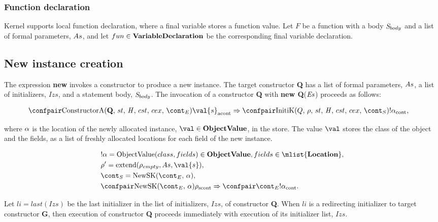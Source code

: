 \documentclass{article}
\DeclareMathOperator{\extend}{extend}
\newcommand{\cesktrans}[2]{\ensuremath{{#1} \Rightarrow {#2}}}
\begin{document}
\subsubsection{Function declaration}

Kernel supports local function declaration, where a final variable stores a function value.
Let $F$ be a function with a body $\mathit{S}_{body}$ and a list of formal parameters, $As$, and let $fun \in \mathbf{VariableDeclaration}$ be the corresponding final variable declaration.


\subsection{New instance creation}

\newcommand{\Initializer}[1]{\mathrm{Initializer}(#1)}
\newcommand{\SuperInitializer}[2]{\mathrm{SuperInitializer}(#1,\,#2)}
\newcommand{\RedirectingInitializer}[2]{\mathrm{RedirectingInitializer}(#1,\,#2)}

The expression \textbf{new} invokes a constructor to produce a new instance.
The target constructor \textbf{Q} has a list of formal parameters, $As$, a list of initializers, $Izs$, and a statement body, $\mathit{S}_{body}$.
The invocation of a constructor \textbf{Q} with \textbf{new Q}($\mathit{E}\mathit{s}$) proceeds as follows:

\begin{align*}
    &\cesktrans%
        {\acontconf{\ConstructorA{\textbf{Q}}{\econt}}{\val{s}}}%
        {\contconf{\InitK{Q}{\env}{\scont}}{!\loc}},
\end{align*}

\noindent where $\alpha$ is the location of the newly allocated instance, $\val \in \dobjval$, in the store.
The value $\val$ stores the class of the object and the fields, as a list of freshly allocated locations for each field of the new instance.

\begin{align*}
    &\deref{\loc} = \objval \in \dobjval, fields \in \mlist{\dlocation},\\
    &\env' = \extend(\env_{empty}, \formals, \val{s}),\\
    &\scont = \NewSK{\econt}{\loc},\\
    &\cesktrans{\scontconf{\NewSK{\econt}{\loc}}{\env}}{\contconf{\econt}{\deref{\loc}}}.
\end{align*}

Let $li = last(Izs)$ be the last initializer in the list of initializers, $Izs$, of constructor \textbf{Q}.
When $li$ is a redirecting initializer to target constructor \textbf{G}, then execution of constructor \textbf{Q} proceeds immediately with execution of its initializer list, $Izs$.
\end{document}
